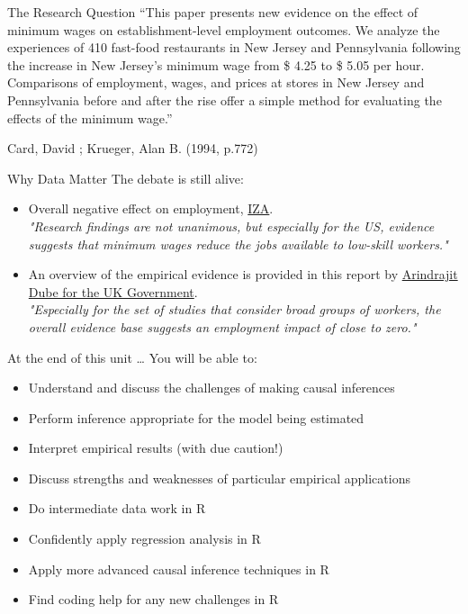 \documentclass[
  ignorenonframetext,
]{beamer}
\begin{document}
\begin{frame}{The Research Question}
\protect\hypertarget{the-research-question}{}
``This paper presents new evidence on the effect of minimum wages on
establishment-level employment outcomes. We analyze the experiences of
410 fast-food restaurants in New Jersey and Pennsylvania following the
increase in New Jersey's minimum wage from \$ 4.25 to \$ 5.05 per hour.
Comparisons of employment, wages, and prices at stores in New Jersey and
Pennsylvania before and after the rise offer a simple method for
evaluating the effects of the minimum wage.''

Card, David ; Krueger, Alan B. (1994, p.772)
\end{frame}

\begin{frame}{Why Data Matter}
\protect\hypertarget{why-data-matter}{}
The debate is still alive:

\begin{itemize}
  \item Overall negative effect on employment, \href{https://wol.iza.org/articles/employment-effects-of-minimum-wages}{IZA}.\\
  \emph{"Research findings are not unanimous, but especially for the US, evidence suggests that minimum wages reduce the jobs available to low-skill workers."}
  \item An overview of the empirical evidence is provided in this report by \href{https://assets.publishing.service.gov.uk/government/uploads/system/uploads/attachment_data/file/844350/impacts_of_minimum_wages_review_of_the_international_evidence_Arindrajit_Dube_web.pdf}{Arindrajit Dube for the UK Government}. \\
  \emph{"Especially for the set of studies that consider broad groups of workers, the overall evidence base suggests an employment impact of close to zero."}
\end{itemize}
\end{frame}

\begin{frame}{At the end of this unit \ldots{}}
\protect\hypertarget{at-the-end-of-this-unit}{}
You will be able to:

\begin{itemize}
  \item Understand and discuss the challenges of making causal inferences
  \item Perform inference appropriate for the model being estimated
  \item Interpret empirical results (with due caution!)
  \item Discuss strengths and weaknesses of particular empirical applications
  \item Do intermediate data work in R
  \item Confidently apply regression analysis in R
  \item Apply more advanced causal inference techniques in R
  \item Find coding help for any new challenges in R

\end{itemize}
\end{frame}
\end{document}
